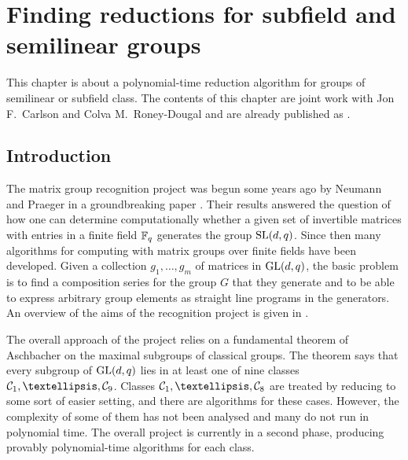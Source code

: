 
\chapter{Finding reductions for subfield and semilinear groups}
\label{chap:subsemi}

This chapter is about a polynomial-time reduction algorithm 
for groups of semilinear or subfield class.
The contents of this
chapter are joint work with Jon F.~Carlson and Colva M.~Roney-Dougal and 
are already published as \cite{subfieldpaper}.



\section{Introduction}\label{sec:intro}

The matrix group recognition project was begun some years ago 
by Neumann and Praeger in a groundbreaking paper
\cite{neumann-praeger}. Their results answered the question of how 
one can determine computationally whether a given set 
of invertible matrices with entries in a finite 
field $\mathbb{F}_q$ generates the group $\SL(d,q)$. 
Since then many algorithms for computing with matrix groups 
over finite fields have been developed. Given a collection 
$g_1, \ldots, g_m$ of  matrices in $\GL(d, q)$, the 
basic problem is to find a composition series for the 
group $G$ that they generate and to be able to express arbitrary 
group elements as straight line programs in the generators.  
An overview of the  aims of the recognition 
project  is given in \cite{MatGrpProj}.

The overall approach of  the project relies on a fundamental 
theorem of Aschbacher \cite{aschbacher} on the maximal
subgroups of classical groups. The theorem says that every subgroup of
$\GL(d,q)$ lies in at least one of nine classes $\CC1, \ldots, \CC9$.
Classes $\CC1, \ldots, \CC8$ are treated by reducing to 
some sort of easier setting, and there are algorithms  
for these cases. However, the
complexity of some of them has not been analysed and many
do not run in polynomial time. The overall project is currently in a 
second phase, producing provably polynomial-time algorithms for
each class. 

